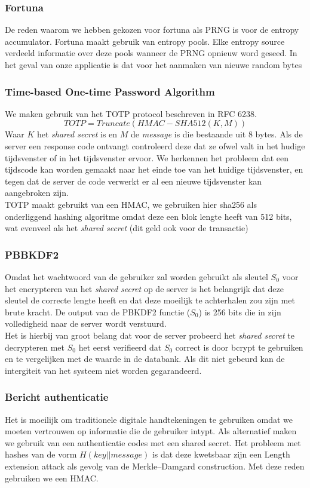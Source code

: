 \documentclass[11pt]{article}
\begin{document}
\subsubsection{Fortuna}
\label{sec:fortuna}
De reden waarom we hebben gekozen voor fortuna als PRNG is voor de entropy accumulator. Fortuna maakt gebruik van entropy pools. Elke entropy source verdeeld informatie over deze pools wanneer de PRNG opnieuw word geseed. In het geval van onze applicatie is dat voor het aanmaken van nieuwe random bytes

\subsubsection{Time-based One-time Password Algorithm}
\label{sec:totp}
We maken gebruik van het TOTP protocol beschreven in RFC 6238.
$$ TOTP = Truncate(HMAC-SHA512(K,M))$$
Waar $K$ het \emph{shared secret} is en $M$ de \emph{message} is die bestaande uit 8 bytes. Als de server een response code ontvangt controleerd deze dat ze ofwel valt in het hudige tijdsvenster of in het tijdsvenster ervoor. We herkennen het probleem dat een tijdscode kan worden gemaakt naar het einde toe van het huidige tijdsvenster, en tegen dat de server de code verwerkt er al een nieuwe tijdsvenster kan aangebroken zijn.\\

TOTP maakt gebruikt van een HMAC, we gebruiken hier sha256 als onderliggend hashing algoritme omdat deze een blok lengte heeft van 512 bits, wat evenveel als het \emph{shared secret} (dit geld ook voor de transactie)
\subsubsection{PBBKDF2}
\label{sec:pbkdf2}
Omdat het wachtwoord van de gebruiker zal worden gebruikt als sleutel $S_{0}$ voor het encrypteren van het \emph{shared secret} op de server is het belangrijk dat deze sleutel de correcte lengte heeft en dat deze moeilijk te achterhalen zou zijn met brute kracht. De output van de PBKDF2 functie ($S_{0}$) is 256 bits die in zijn volledigheid naar de server wordt verstuurd.\\

Het is hierbij van groot belang dat voor de server probeerd het \emph{shared secret} te decrypteren met $S_{0}$ het eerst verifieerd dat $S_{0}$ correct is door bcrypt te gebruiken en te vergelijken met de waarde in de databank. Als dit niet gebeurd kan de intergiteit van het systeem niet worden gegarandeerd. 
\subsubsection{Bericht authenticatie}
\label{sec:mac}
Het is moeilijk om traditionele digitale handtekeningen te gebruiken omdat we moeten vertrouwen op informatie die de gebruiker intypt. Als alternatief maken we gebruik van een authenticatie codes met een shared secret. Het probleem met hashes van de vorm $H(key || message)$ is dat deze kwetsbaar zijn een Length extension attack als gevolg van de Merkle–Damgard construction. Met deze reden gebruiken we een HMAC.
\end{document}
